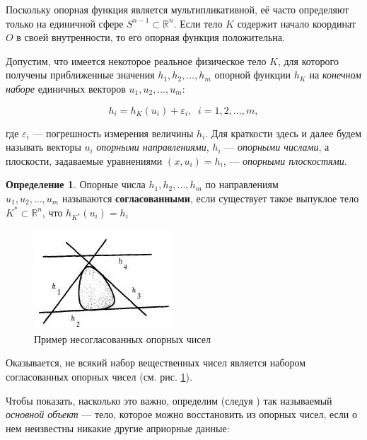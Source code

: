 \documentclass[a4paper, 10pt]{article}
\theoremstyle{definition}
\newtheorem{SmartDefinition}{Определение}
\theoremstyle{plain}
\theoremstyle{plain}
\begin{document}
Поскольку опорная функция является мультипликативной, её часто определяют только
на единичной сфере $S^{n - 1} \subset \mathbb{R}^{n}$. Если тело $K$ содержит
начало координат $O$ в своей внутренности, то его опорная функция положительна.

Допустим, что имеется некоторое реальное физическое тело $K$, для которого
получены приближенные значения $h_{1}, h_{2}, \ldots, h_{m}$ опорной функции
$h_{K}$ на \textit{конечном наборе} единичных векторов
$u_{1}, u_{2}, \ldots, u_{m}$:

\begin{equation}
 h_{i} = h_{K}(u_{i}) + \varepsilon_{i}, \;\; i = 1, 2, \ldots, m,
\end{equation}

где $\varepsilon_{i}$ --- погрешность измерения величины $h_{i}$. Для краткости
здесь и далее будем называть векторы $u_{i}$ \textit{опорными направлениями},
$h_{i}$ --- \textit{опорными числами}, а плоскости, задаваемые уравнениями
$(x, u_{i}) = h_{i}$, --- \textit{опорными плоскостями}.

\begin{SmartDefinition}
 \label{def:consistency}
 Опорные числа $h_{1}, h_{2}, \ldots, h_{m}$ по направлениям \\
 $u_{1}, u_{2}, \ldots, u_{m}$ называются \textbf{согласованными}, если
 существует такое выпуклое тело  $K^{*} \subset \mathbb{R}^{n}$, что
 $h_{K^{*}}(u_{i}) = h_{i}$
\end{SmartDefinition}

\begin{figure}
 \begin{center}
  \includegraphics{images/inconsistent-support-planes.jpg}
 \end{center}
 \caption{Пример несогласованных опорных чисел}
 \label{image:inconsistent}
\end{figure}

Оказывается, не всякий набор вещественных чисел является набором согласованных
опорных чисел (см. рис. \ref{image:inconsistent}).

Чтобы показать, насколько это важно, определим (следуя
\cite{Prince:1990:RCS:81024.81035}) так называемый \textit{основной объект} ---
тело, которое можно восстановить из опорных чисел, если о нем неизвестны никакие
другие априорные данные:
\end{document}
